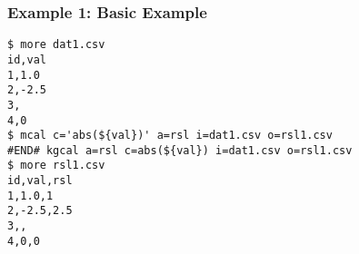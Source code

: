 \subsubsection*{Example 1: Basic Example}



\begin{Verbatim}[baselinestretch=0.7,frame=single]
$ more dat1.csv
id,val
1,1.0
2,-2.5
3,
4,0
$ mcal c='abs(${val})' a=rsl i=dat1.csv o=rsl1.csv
#END# kgcal a=rsl c=abs(${val}) i=dat1.csv o=rsl1.csv
$ more rsl1.csv
id,val,rsl
1,1.0,1
2,-2.5,2.5
3,,
4,0,0
\end{Verbatim}
